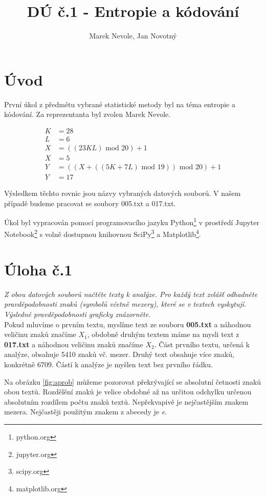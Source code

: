 \documentclass[czech]{mvi-report}
\title{DÚ č.1 - Entropie a kódování}
\author{Marek Nevole, Jan Novotný}
\affiliation{ČVUT - FIT}
\begin{document}
\maketitle

\section{Úvod}
První úkol z předmětu vybrané statistické metody byl na téma entropie a kódování. Za reprezentanta byl zvolen Marek Nevole.

\begin{align*}
  K &= 28\\
  L &= 6\\
  X &= ((23KL)\text{ mod }20) + 1\\
  X &= 5\\
  Y &= ((X + ((5K + 7L)\text{ mod }19))\text{ mod }20) + 1\\
  Y &= 17
\end{align*}

Výsledkem těchto rovnic jsou názvy vybraných datových souborů. V našem případě budeme pracovat se soubory 005.txt a 017.txt.

Úkol byl vypracován pomocí programovacího jazyku Python\footnote{python.org} v prostředí Jupyter Notebook\footnote{jupyter.org} s volně dostupnou knihovnou SciPy\footnote{scipy.org} a Matplotlib\footnote{matplotlib.org}.

\section{Úloha č.1}
\textit{Z obou datových souborů načtěte texty k analýze. Pro každý text zvlášť odhadněte pravděpodobnosti znaků (symbolů včetně mezery), které se v textech vyskytují. Výsledné pravděpodobnosti graficky znázorněte.}\\

Pokud mluvíme o prvním textu, myslíme text ze souboru \textbf{005.txt} a náhodnou veličinu znaků značíme $ X_1 $, obdobně druhým textem máme na mysli text z \textbf{017.txt} a náhodnou veličinu znaků značíme $ X_2 $. Část prvního textu, určená k analýze, obsahuje 5410 znaků vč. mezer. Druhý text obsahuje více znaků, konkrétně 6709. Částí k analýze je myšlen text bez prvního řádku.

Na obrázku \ref{fig:aprob} můžeme pozorovat překrývající se absolutní četnosti znaků obou textů. Rozdělění znaků je velice obdobné až na určitou odchylku určenou absolutním rozdílem počtu znaků textů. Nepřekvapivě je nejčastějším znakem mezera. Nejčastěji použitým znakem z abecedy je \textit{e}.
\end{document}
